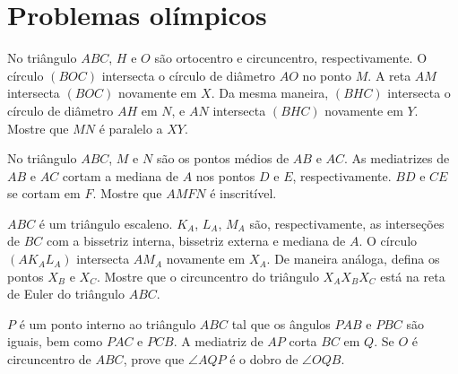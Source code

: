 \documentclass[10pt, a4paper]{article}
\begin{document}
	\section{Problemas olímpicos}
	\begin{prob}[ELMO 2014]
		No triângulo $ABC$, $H$ e $O$ são ortocentro e circuncentro, respectivamente.
		O círculo $(BOC)$ intersecta o círculo de diâmetro $AO$ no ponto $M$.
		A reta $AM$ intersecta $(BOC)$ novamente em $X$.
		Da mesma maneira, $(BHC)$ intersecta o círculo de diâmetro $AH$ em $N$, e $AN$ intersecta $(BHC)$ novamente em $Y$.
		Mostre que $MN$ é paralelo a $XY$.
	\end{prob}
	\begin{prob}[USAMO 2008]
		No triângulo $ABC$, $M$ e $N$ são os pontos médios de $AB$ e $AC$.
		As mediatrizes de $AB$ e $AC$ cortam a mediana de $A$ nos pontos $D$ e $E$, respectivamente.
		$BD$ e $CE$ se cortam em $F$.
		Mostre que $AMFN$ é inscritível.
	\end{prob}
	\begin{prob}
		$ABC$ é um triângulo escaleno. $K_A$, $L_A$, $M_A$ são, respectivamente, as interseções de $BC$ com a bissetriz interna, bissetriz externa e mediana de $A$. O círculo $(AK_AL_A)$ intersecta $AM_A$ novamente em $X_A$. De maneira análoga, defina os pontos $X_B$ e $X_C$. Mostre que o circuncentro do triângulo $X_AX_BX_C$ está na reta de Euler do triângulo $ABC$.
	\end{prob}
	\begin{prob}
		$P$ é um ponto interno ao triângulo $ABC$ tal que os ângulos $PAB$ e $PBC$ são iguais, bem como $PAC$ e $PCB$. A mediatriz de $AP$ corta $BC$ em $Q$. Se $O$ é circuncentro de $ABC$, prove que $\angle AQP$ é o dobro de $\angle OQB$.
	\end{prob}
\end{document}
